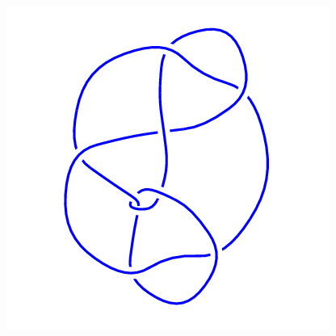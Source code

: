 \begin{figure}[H]
\begin{minipage}[b]{.18\linewidth}
	\end{minipage}
	\begin{minipage}[b]{.18\linewidth}
		\centering
		\includegraphics[width=\linewidth]{../data/9_45.png}
	\end{minipage}
\end{figure}
